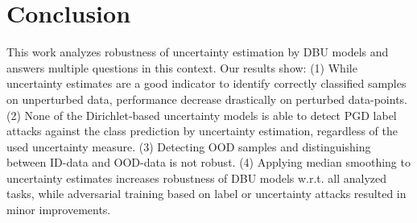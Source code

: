 \section{Conclusion}
\label{sec:conclusion}

This work analyzes robustness of uncertainty estimation by DBU models and answers multiple questions in this context. Our results show: (1) While uncertainty estimates are a good indicator to identify correctly classified samples on unperturbed data, performance decrease drastically on perturbed data-points. (2) None of the Dirichlet-based uncertainty models is able to detect PGD label attacks against the class prediction by uncertainty estimation, regardless of the used uncertainty measure. (3) Detecting OOD samples and distinguishing between ID-data and OOD-data is not robust. (4) Applying median smoothing to  uncertainty estimates increases robustness of DBU models w.r.t. all analyzed tasks, while adversarial training based on label or uncertainty attacks resulted in minor improvements. 



